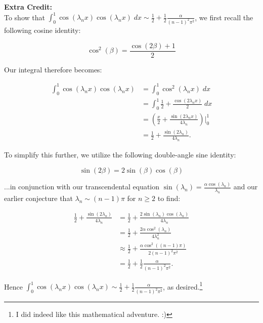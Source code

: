 \begin{solution}
    \pagebreak
    \textbf{Extra Credit:}\ \\

    To show that $\int_{0}^{1}{\cos{(\lambda_n x)} \cos{(\lambda_n x)}\; dx} \sim \frac{1}{2} + \frac{1}{2} \frac{\alpha}{(n - 1)^2 \pi^2}$,
    we first recall the following cosine identity:

    $$
        \cos^{2}{(\beta)} = \frac{\cos{(2 \beta)} + 1}{2}
    $$

    Our integral therefore becomes:

    \begin{align*}
        \int_{0}^{1}{\cos{(\lambda_n x)} \cos{(\lambda_n x)}} &= \int_{0}^{1}{\cos^2{(\lambda_n x)}\; dx} \\
                                                              &= \int_{0}^{1}{\frac{1}{2} + \frac{\cos{(2 \lambda_n x)}}{2}\; dx} \\
                                                              &= \left( \frac{x}{2} + \frac{\sin{(2 \lambda_n x)}}{4 \lambda_n} \right) \bigg\vert_{0}^{1} \\
                                                              &= \frac{1}{2} + \frac{\sin{(2 \lambda_n)}}{4 \lambda_n}.
    \end{align*}

    To simplify this further, we utilize the following double-angle sine identity:

    $$
        \sin{(2 \beta)} = 2 \sin{(\beta)} \cos{(\beta)}
    $$

    ...in conjunction with our transcendental equation $\sin{(\lambda_n) = \frac{\alpha \cos{(\lambda_n)}}{\lambda_n}}$ and our
    earlier conjecture that $\lambda_n \sim (n - 1) \pi$ for $n \ge 2$ to find:

    \begin{align*}
        \frac{1}{2} + \frac{\sin{(2 \lambda_n)}}{4 \lambda_n} &= \frac{1}{2} + \frac{2 \sin{(\lambda_n)} \cos{(\lambda_n)}}{4 \lambda_n} \\
                                                              &= \frac{1}{2} + \frac{2 \alpha \cos^2{(\lambda_n)}}{4 \lambda_n^2} \\
                                                              &\approx \frac{1}{2} + \frac{\alpha \cos^2{\left((n-1) \pi\right)}}{2 (n-1)^2 \pi^2} \\
                                                              &= \frac{1}{2} + \frac{1}{2} \frac{\alpha}{(n-1)^2 \pi^2}.
    \end{align*}

    Hence $\int_{0}^{1}{\cos{(\lambda_n x)} \cos{(\lambda_n x)}} \sim \frac{1}{2} + \frac{1}{2} \frac{\alpha}{(n-1)^2 \pi^2}$, as desired.\footnote{
        I did indeed like this mathematical adventure. :)
    }
\end{solution}